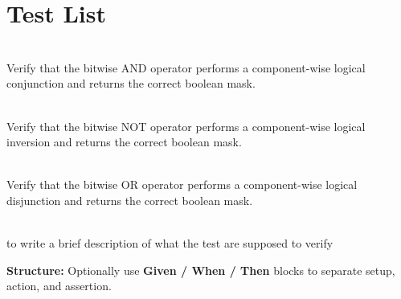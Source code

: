 \chapter{Test List }
\hypertarget{test}{}\label{test}

\begin{DoxyRefList}
\item[{\parbox[t]{\linewidth}{Member \doxylink{group___f_g_m___vec4___bool___bit_ga44131d22c6063a32bbdd392b842236ec}{Boolean\+Vector\+Bit\+Operations\+\_\+\+Bitwise\+And\+Returns\+Componentwise\+And} ()}}]\hfill \\
\label{test__test000040}%
%
Verify that the  bitwise AND operator performs a component-\/wise logical conjunction and returns the correct boolean mask.  
\item[{\parbox[t]{\linewidth}{Member \doxylink{group___f_g_m___vec4___bool___bit_ga115059e07cb3ceaab4bf7aa21dd7029e}{Boolean\+Vector\+Bit\+Operations\+\_\+\+Bitwise\+Not\+Returns\+Inverted\+Vector} ()}}]\hfill \\
\label{test__test000042}%
%
Verify that the  bitwise NOT operator performs a component-\/wise logical inversion and returns the correct boolean mask.  
\item[{\parbox[t]{\linewidth}{Member \doxylink{group___f_g_m___vec4___bool___bit_gaf4014130ef76d4430ddc18cfeca9b9c2}{Boolean\+Vector\+Bit\+Operations\+\_\+\+Bitwise\+Or\+Returns\+Componentwise\+Or} ()}}]\hfill \\
\label{test__test000041}%
%
Verify that the  bitwise OR operator performs a component-\/wise logical disjunction and returns the correct boolean mask.  
\item[{\parbox[t]{\linewidth}{Page \doxylink{md__documentation_guideline}{Documentation Guideline for Falcon Game Math Library (FGM)} }}]\hfill \\
\label{test__test000001}%
%
to write a brief description of what the test are supposed to verify
\begin{DoxyItemize}
\item {\bfseries{Structure:\+}} Optionally use {\bfseries{Given /\+ When /\+ Then}} blocks to separate setup, action, and assertion.
\end{DoxyItemize}

\end{DoxyRefList}
